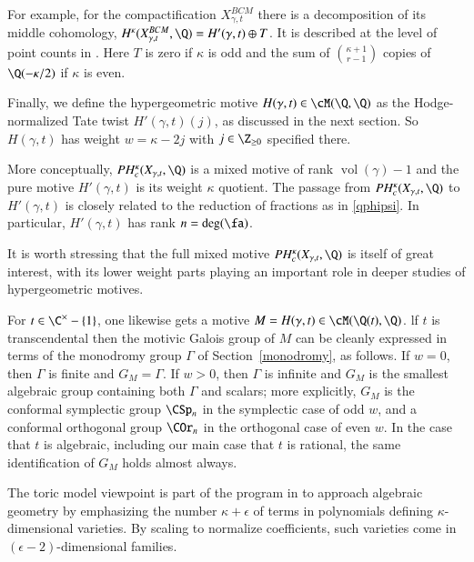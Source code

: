 \documentclass{notices}
\numberwithin{equation}{section}
\numberwithin{table}{section}
\numberwithin{figure}{section}
\DeclareMathOperator{\vol}{vol}
\begin{document}
{For example, for the compactification $X^{BCM}_{\gamma,t}$ there is a
decomposition of its middle cohomology,
$H^{\kappa}(X^{BCM}_{\gamma,t},\Q) = H'(\gamma,t) \oplus T$. It is described
at the level of point counts in \cite[Thm~1.5]{BCM}.  Here $T$ is zero
if $\kappa$ is odd and the sum of $\binom{\kappa+1}{r-1}$ copies of
$\Q(-\kappa/2)$ if $\kappa$ is even.

Finally, we define the hypergeometric motive $H(\gamma,t) \in \cM(\Q,\Q)$ as the Hodge-normalized Tate
twist $H'(\gamma,t)(j)$, as discussed in the next section.  So
$H(\gamma,t)$ has weight $w = \kappa-2j$ with $j \in \Z_{\geq 0}$
specified there.  

More conceptually, $PH_c^\kappa(X_{\gamma,t},\Q)$ is a mixed motive of
rank $\vol(\gamma)-1$ and the pure motive $H'(\gamma,t)$ is its weight
$\kappa$ quotient.  The passage from $PH_c^\kappa(X_{\gamma,t},\Q)$ to
$H'(\gamma,t)$ is closely related to the reduction of fractions as in
\eqref{qphipsi}.  In particular, $H'(\gamma,t)$ has rank
$n = \deg(\fa)$.

It is worth stressing that the full mixed motive
$PH_c^\kappa(X_{\gamma,t},\Q)$ is itself of great interest, with its
lower weight parts playing an important role in deeper studies of
hypergeometric motives. 






 


 For $t \in \C^\times-\{1\}$, one likewise
gets a motive $M = H(\gamma,t) \in \cM(\Q(t),\Q)$. lf $t$ is transcendental 
then the motivic Galois group of $M$
can be cleanly expressed in terms of the monodromy
group $\Gamma$ of Section~\ref{monodromy}, as follows.   
 If $w=0$, then $\Gamma$ is finite and $G_M=\Gamma$.  
 If $w>0$, then $\Gamma$ is infinite and $G_M$ is 
 the smallest algebraic group containing both $\Gamma$
 and scalars; more explicitly, $G_M$ is the conformal
 symplectic group $\CSp_n$ in the symplectic
 case of odd $w$, and a conformal orthogonal group
 $\COr_n$ in the orthogonal case of even $w$. 
  In the case that $t$ is algebraic, including our main case that
 $t$ is rational, the same identification of $G_M$
 holds almost always.  
 

 
 
  The
toric model viewpoint is part of 
the program in  \cite{GKZ} to approach
algebraic geometry by emphasizing
the number $\kappa+\epsilon$ of terms 
in polynomials defining $\kappa$-dimensional 
varieties.   By scaling to normalize coefficients,
such varieties come in $(\epsilon-2)$-dimensional
families.  

}
\end{document}
